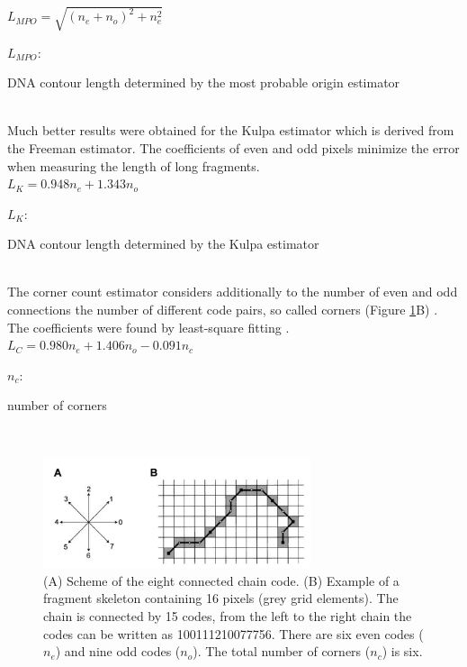 \documentclass{article}
\begin{document}
$ L_{MPO} = \sqrt{(n_{e} + n_{o})^{2} + n_{e}^{2}} $

\hspace{0,2cm}

$ L_{MPO} $: \begin{footnotesize}
DNA contour length determined by the most probable origin estimator
\end{footnotesize} \\

Much better results were obtained for the Kulpa estimator which is derived from the Freeman estimator. The coefficients of even and odd pixels minimize the error when measuring the length of long fragments.\\

$ L_{K} = 0.948n_{e} + 1.343 n_{o} $

\hspace{0,2cm}

$ L_{K} $: \begin{footnotesize}
DNA contour length determined by the Kulpa estimator
\end{footnotesize} \\

The corner count estimator considers additionally to the number of even and odd connections the number of different code pairs, so called corners (Figure \ref{fig: freeman}B)  \cite{vossepoel1982vector}. The coefficients were found by least-square fitting  \cite{yang1994methods}.  \\


$ L_{C} = 0.980n_{e} + 1.406 n_{o} - 0.091 n_{c} $

\hspace{0,2cm}

$ n_{c} $: \begin{footnotesize}
number of corners
\end{footnotesize} \\


\begin{figure}[htb]
\begin{center}
\includegraphics[width = 0.7\textwidth]{freeman}
\end{center}
\caption{(A) Scheme of the eight connected chain code. (B) Example of a fragment skeleton containing 16 pixels (grey grid elements). The chain is connected by 15 codes, from the left to the right chain the codes can be written as 100111210077756. There are six even codes ($ n_{e} $) and nine odd codes ($ n_{o} $). The total number of corners ($ n_{c}$) is six.}
\label{fig: freeman} %
\end{figure}
\end{document}
